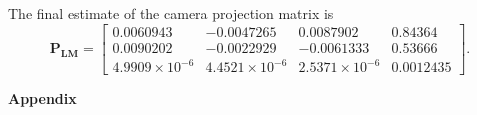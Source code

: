 \documentclass{../../assignment}
\begin{document}
\begin{problemlist}
\begin{enumerate}
The final estimate of the camera projection matrix is
\[
\mathbf{P_{LM}} = 
\begin{bmatrix}
0.0060943 & -0.0047265 & 0.0087902 & 0.84364\\
0.0090202 & -0.0022929 &  -0.0061333 & 0.53666\\
4.9909\times 10^{-6} & 4.4521\times 10^{-6} &  2.5371\times 10^{-6}& 0.0012435
\end{bmatrix}.
\]
\end{enumerate}
\end{problemlist}
\begin{flushleft}
\large{\textbf{Appendix}}
\end{flushleft}






\end{document}
